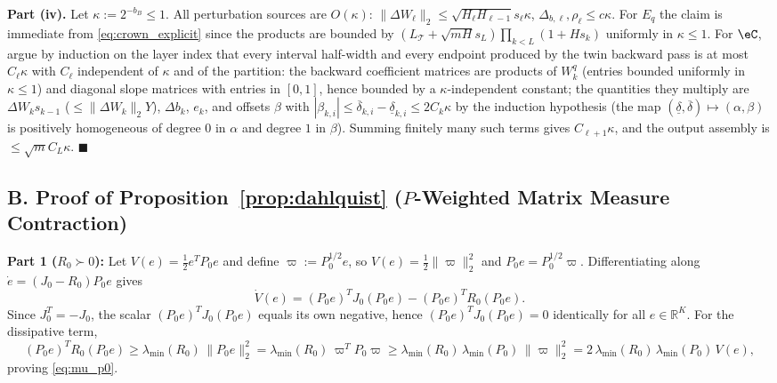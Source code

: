 \textbf{Part (iv).} Let \(\kappa := 2^{-b_B} \le 1\). All perturbation sources are \(O(\kappa)\): \(\|\Delta W_\ell\|_2 \le \sqrt{H_\ell H_{\ell-1}}s_\ell\kappa\), \(\Delta_{b,\ell}, \rho_\ell \le c\kappa\). For \(E_q\) the claim is immediate from \eqref{eq:crown_explicit} since the products are bounded by \((L_{\mathcal{T}} + \sqrt{mH}s_L)\prod_{k<L}(1 + Hs_k)\) uniformly in \(\kappa \le 1\). For \(\eC\), argue by induction on the layer index that every interval half-width and every endpoint produced by the twin backward pass is at most \(C_\ell\kappa\) with \(C_\ell\) independent of \(\kappa\) and of the partition: the backward coefficient matrices are products of \(W_k^q\) (entries bounded uniformly in \(\kappa \le 1\)) and diagonal slope matrices with entries in \([0,1]\), hence bounded by a \(\kappa\)-independent constant; the quantities they multiply are \(\Delta W_k s_{k-1}\) (\(\le \|\Delta W_k\|_2 Y\)), \(\Delta b_k\), \(e_k\), and offsets \(\beta\) with \(|\beta_{k,i}| \le \overline{\delta}_{k,i} - \underline{\delta}_{k,i} \le 2C_k\kappa\) by the induction hypothesis (the map \((\underline\delta, \overline\delta) \mapsto (\alpha, \beta)\) is positively homogeneous of degree \(0\) in \(\alpha\) and degree \(1\) in \(\beta\)). Summing finitely many such terms gives \(C_{\ell+1}\kappa\), and the output assembly is \(\le \sqrt{m}C_L\kappa\). \hfill \(\blacksquare\)

\subsection*{B. Proof of Proposition~\ref{prop:dahlquist} (\(P\)-Weighted Matrix Measure Contraction)}
\textbf{Part 1 (\(R_0 \succ 0\)):} Let \(V(e) = \frac{1}{2}e^T P_0 e\) and define \(\varpi := P_0^{1/2} e\), so \(V(e) = \frac{1}{2}\|\varpi\|_2^2\) and \(P_0 e = P_0^{1/2} \varpi\). Differentiating along \(\dot{e} = (J_0 - R_0)P_0 e\) gives
\[
\dot{V}(e) = (P_0 e)^T J_0 (P_0 e) - (P_0 e)^T R_0 (P_0 e).
\]
Since \(J_0^T = -J_0\), the scalar \((P_0 e)^T J_0 (P_0 e)\) equals its own negative, hence \((P_0 e)^T J_0 (P_0 e) = 0\) identically for all \(e \in \mathbb{R}^K\). For the dissipative term,
\[
(P_0 e)^T R_0 (P_0 e) \ge \lambda_{\min}(R_0)\,\|P_0 e\|_2^2 = \lambda_{\min}(R_0)\,\varpi^T P_0 \varpi \ge \lambda_{\min}(R_0)\,\lambda_{\min}(P_0)\,\|\varpi\|_2^2 = 2\,\lambda_{\min}(R_0)\,\lambda_{\min}(P_0)\,V(e),
\]
proving \eqref{eq:mu_p0}.

